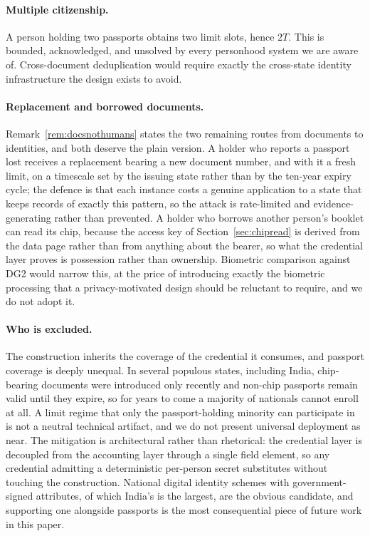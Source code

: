 \documentclass[11pt,a4paper]{article}
\theoremstyle{definition}
\theoremstyle{plain}
\theoremstyle{remark}
\begin{document}
\paragraph{Multiple citizenship.}
A person holding two passports obtains two limit slots, hence $2T$. This is bounded, acknowledged, and unsolved by every personhood system we are aware of. Cross-document deduplication would require exactly the cross-state identity infrastructure the design exists to avoid.

\paragraph{Replacement and borrowed documents.}
Remark~\ref{rem:docsnothumans} states the two remaining routes from documents to identities, and both deserve the plain version. A holder who reports a passport lost receives a replacement bearing a new document number, and with it a fresh limit, on a timescale set by the issuing state rather than by the ten-year expiry cycle; the defence is that each instance costs a genuine application to a state that keeps records of exactly this pattern, so the attack is rate-limited and evidence-generating rather than prevented. A holder who borrows another person's booklet can read its chip, because the access key of Section~\ref{sec:chipread} is derived from the data page rather than from anything about the bearer, so what the credential layer proves is possession rather than ownership. Biometric comparison against DG2 would narrow this, at the price of introducing exactly the biometric processing that a privacy-motivated design should be reluctant to require, and we do not adopt it.

\paragraph{Who is excluded.}
The construction inherits the coverage of the credential it consumes, and passport coverage is deeply unequal. In several populous states, including India, chip-bearing documents were introduced only recently and non-chip passports remain valid until they expire, so for years to come a majority of nationals cannot enroll at all. A limit regime that only the passport-holding minority can participate in is not a neutral technical artifact, and we do not present universal deployment as near. The mitigation is architectural rather than rhetorical: the credential layer is decoupled from the accounting layer through a single field element, so any credential admitting a deterministic per-person secret substitutes without touching the construction. National digital identity schemes with government-signed attributes, of which India's is the largest, are the obvious candidate, and supporting one alongside passports is the most consequential piece of future work in this paper.
\end{document}
